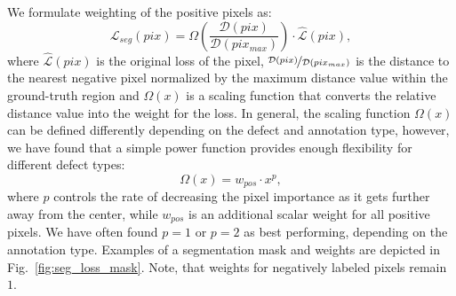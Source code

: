We formulate weighting of the positive pixels as:
\begin{equation}\label{eq:EDT}
    \mathcal{L}_{seg}(pix) = \Omega\left(\frac{\mathcal{D}(pix)}{\mathcal{D}(pix_{max})}\right) \cdot \mathcal{\hat L}(pix),
\end{equation}
where $\mathcal{\hat L}(pix)$ is the original loss of the pixel, $\nicefrac{\mathcal{D}(pix)}{\mathcal{D}(pix_{max})}$ is the distance to the nearest negative pixel normalized by the maximum distance value within the ground-truth region and $\Omega(x)$ is a scaling function that converts the relative distance value into the weight for the loss. In general, the scaling function $\Omega(x)$ can be defined differently depending on the defect and annotation type, however, we have found that a simple power function provides enough flexibility for different defect types:
\begin{equation}
    \Omega(x) = w_{pos} \cdot x^p,
\end{equation}
where $p$ controls the rate of decreasing the pixel importance as it gets further away from the center, while $w_{pos}$ is an additional scalar weight for all positive pixels. We have often found $p=1$ or $p=2$ as best performing, depending on the annotation type. Examples of a segmentation mask and weights are depicted in Fig.~\ref{fig:seg_loss_mask}. Note, that weights for negatively labeled pixels remain $1$. 

